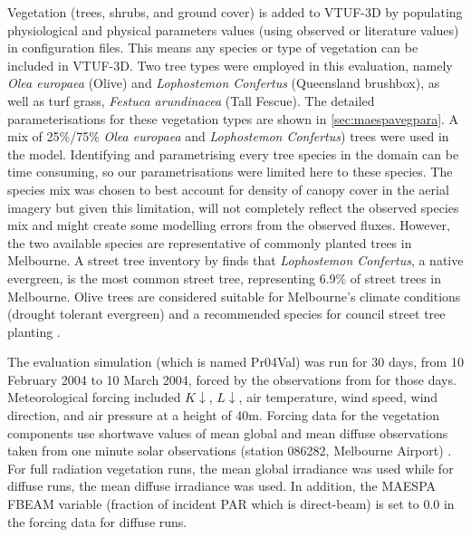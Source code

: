 \documentclass[final,3p,times,authoryear]{elsarticle}
\begin{document}
Vegetation (trees, shrubs, and ground cover) is added to VTUF-3D by populating physiological and physical parameters values (using observed or literature values) in configuration files. This means any species or type of vegetation can be included in VTUF-3D. Two tree types were employed in this evaluation, namely \textit{Olea europaea} (Olive) and \textit{Lophostemon Confertus} (Queensland brushbox), as well as turf grass, \textit{Festuca arundinacea} (Tall Fescue). The detailed parameterisations for these vegetation types are shown in \ref{sec:maespavegpara}. A mix of 25\%/75\% \textit{Olea europaea} and \textit{Lophostemon Confertus}) trees were used in the model. Identifying and parametrising every tree species in the domain can be time consuming, so our parametrisations were limited here to these species. The species mix was chosen to best account for density of canopy cover in the aerial imagery but given this limitation, will not completely reflect the observed species mix and might create some modelling errors from the observed fluxes. However, the two available species are representative of commonly planted trees in Melbourne. A street tree inventory by \cite{Frank2006} finds that \textit{Lophostemon Confertus}, a native evergreen, is the most common street tree, representing 6.9\% of street trees in Melbourne. Olive trees are considered suitable for Melbourne's climate conditions (drought tolerant evergreen) and a recommended species for council street tree planting \citep{PortPhillip2010}.

The evaluation simulation (which is named Pr04Val) was run for 30 days, from 10 February 2004 to 10 March 2004, forced by the observations from \cite{Coutts2007} for those days. Meteorological forcing included $K\downarrow$, $L\downarrow$, air temperature, wind speed, wind direction, and air pressure at a height of 40m. Forcing data for the vegetation components use shortwave values of mean global and mean diffuse observations taken from one minute solar observations (station 086282, Melbourne Airport) \citep{BOM2016}. For full radiation vegetation runs, the mean global irradiance was used while for diffuse runs, the mean diffuse irradiance was used. In addition, the MAESPA FBEAM variable (fraction of incident PAR which is direct-beam) is set to 0.0 in the forcing data for diffuse runs.
\end{document}
